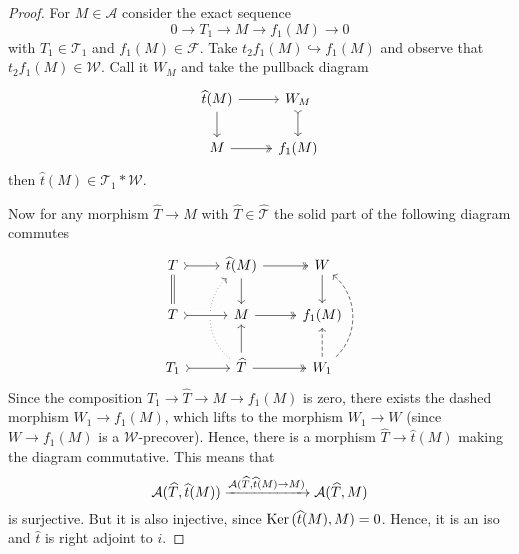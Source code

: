 \begin{proof}
  For $M\in\mathcal{A}$ consider the exact sequence
  \begin{equation*}
    0\rightarrow T_1\rightarrow M\rightarrow f_1(M) \rightarrow 0
  \end{equation*}
  with $T_1\in\mathcal{T}_1$ and $f_1(M)\in\mathcal{F}$. Take $t_2f_1(M)\hookrightarrow f_1(M)$ and observe
  that $t_2f_1(M)\in \mathcal{W}$. Call it $W_M$ and take the pullback diagram
  \begin{equation*}
    \begin{tikzcd}
      \widehat{t}(M)\arrow{r}\arrow{d}
        & W_M\arrow[tail]{d}\\
      M \arrow[two heads]{r}
        & f_1(M)
    \end{tikzcd}
  \end{equation*}
  then $\widehat{t}(M)\in\mathcal{T}_1\ast\mathcal{W}$.

  Now for any morphism $\widehat{T}\to M$ with $\widehat{T}\in\widehat{\mathcal{T}}$ the solid part
  of the following diagram commutes
  \begin{equation*}
    \begin{tikzcd}
      T\arrow[tail]{r}\arrow[equal]{d}
        & \widehat{t}(M)\arrow[two heads]{r}\arrow{d}\arrow[from=dd,bend left=50,dotted]
          & W\arrow{d}\\
      T \arrow[tail,crossing over]{r}
        & M\arrow[two heads]{r}
          & f_1(M)\\
      T_1\arrow[tail]{r}
        & \widehat{T}\arrow[two heads]{r}\arrow{u}
          & W_1\arrow[dashed]{u}\arrow[bend right=50,dashed]{uu}
    \end{tikzcd}
  \end{equation*}
  Since the composition $T_1\to \widehat{T}\to M\to f_1(M)$ is zero, there exists the dashed
  morphism $W_1\to f_1(M)$, which lifts to the morphism $W_1\to W$ (since $W\to f_1(M)$ is a $\mathcal{W}$-precover).
  Hence, there is a morphism $\widehat{T}\to \widehat{t}(M)$ making the diagram commutative. This means that
  \begin{equation*}
    \mathcal{A}(\widehat{T},\widehat{t}(M))\xrightarrow{\mathcal{A}(\widehat{T},\widehat{t}(M)\to M)}
      \mathcal{A}(\widehat{T},M)
  \end{equation*}
  is surjective. But it is also injective, since $\mathrm{\textup{Ker\,}} (\widehat{t}(M),M)=0$. Hence, it is an iso and $\widehat{t}$ is
  right adjoint to $i$.
\end{proof}

